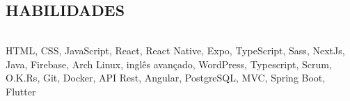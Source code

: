 \begin{framed}
    \section{HABILIDADES}
    \begin{tabular}{r|p{5cm}}
    \end{tabular}
    HTML, CSS, JavaScript, React, React Native, Expo, TypeScript, Sass,  NextJs, Java, Firebase, Arch Linux, inglês avançado, WordPress, Typescript, Scrum, O.K.Rs, Git, Docker, API Rest, Angular, PostgreSQL, MVC, Spring Boot, Flutter
  \end{framed}
